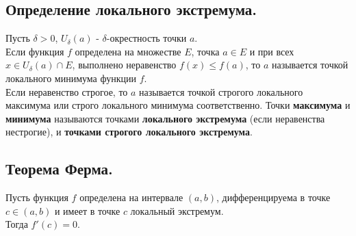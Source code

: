 

\label{sec_Definition11}
\begin{definition}
    \subsection*{Определение локального экстремума.}
    \begin{note}[purple]
        Пусть $\delta > 0$, $U_{\delta}(a)$ - $\delta$-окрестность точки $a$. \\
        Если функция $f$ определена на множестве $E$, точка $a \in E$ и при всех 
        $x \in U_{\delta}(a) \cap E$, выполнено неравенство $f(x) \leq f(a)$, 
        то $a$ называется точкой локального минимума функции $f$. \\
        Если неравенство строгое, то $a$ называется точкой строгого локального максимума
        или строго локального минимума соответственно. Точки \textbf{максимума} и \textbf{минимума} называются
        точками \textbf{локального экстремума} (если неравенства нестрогие), и \textbf{точками строгого 
        локального экстремума}.
    \end{note}

    \subsection*{Теорема Ферма.}
    \begin{note}[purple]
        Пусть функция $f$ определена на интервале $(a, b)$, дифференцируема в точке $c \in (a, b)$
        и имеет в точке $c$ локальный экстремум. \\
        Тогда $f'(c) = 0$. 
    \end{note}
\end{definition}